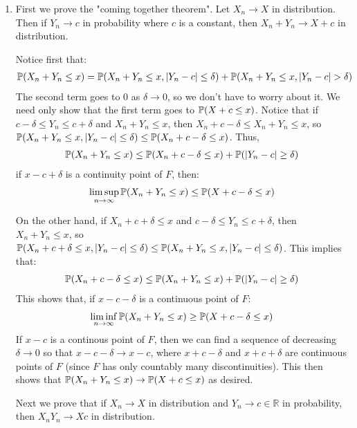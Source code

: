 \documentclass[12pt]{article}
\theoremstyle{definitionstyle}
\def\mbb#1{\mathbb{#1}}
\def\R{\mbb{R}}
\newcommand{\1}{\mathds 1}
\renewcommand{\P}{\mathbb P \qty}
\begin{document}
\begin{enumerate}
        \item 
        First we prove the "coming together theorem". Let $X_n \to X$ in distribution. Then if $Y_n \to c$ in probability where $c$ is a constant, then $X_n + Y_n \to X + c$ in distribution. 

        Notice first that:
        \begin{align*}
            \P(X_n+Y_n \leq x) = \P(X_n + Y_n \leq x, |Y_n-c| \leq \delta) + \P(X_n+Y_n \leq x, |Y_n-c|>\delta)
        \end{align*}
        The second term goes to 0 as $\delta \to 0$, so we don't have to worry about it. We need only show that the first term goes to $\P(X+c \leq x)$. Notice that if $c - \delta \leq Y_n \leq c + \delta$ and $X_n + Y_n \leq x$, then $X_n + c - \delta \leq X_n + Y_n \leq x$, so $\P(X_n + Y_n \leq x, |Y_n-c| \leq \delta) \leq \P(X_n+c-\delta \leq x)$. Thus, 
        \begin{align*}
            \P(X_n+Y_n \leq x) \leq \P(X_n+c-\delta \leq x) + \P(|Y_n-c| \geq \delta)
        \end{align*}
        if $x-c+\delta$ is a continuity point of $F$, then:
        \begin{align*}
            \limsup_{n \to \infty} \P(X_n+Y_n \leq x) \leq \P(X+c-\delta \leq x)
        \end{align*}
        
        On the other hand, if $X_n+c+\delta \leq x$ and $c - \delta \leq Y_n \leq c + \delta$, then $X_n+Y_n \leq x$, so $\P(X_n+c+\delta \leq x, |Y_n-c| \leq \delta) \leq \P(X_n+Y_n \leq x, |Y_n-c| \leq \delta)$. This implies that:
        \begin{align*}
            \P(X_n+c-\delta \leq x) \leq \P(X_n+Y_n \leq x) + \P(|Y_n-c| \geq \delta)
        \end{align*}
        This shows that, if $x-c-\delta$ is a continuous point of $F$:
        \begin{align*}
            \liminf_{n \to \infty} \P(X_n+Y_n \leq x) \geq \P(X+c-\delta \leq x)
        \end{align*}
        If $x-c$ is a continous point of $F$, then we can find a sequence of decreasing $\delta \to 0$ so that $x-c-\delta \to x-c$, where $x+c-\delta$ and $x+c+\delta$ are continuous points of $F$ (since $F$ has only countably many discontinuities). This then shows that $\P(X_n+Y_n \leq x) \to \P(X+c \leq x)$ as desired.

        Next we prove that if $X_n \to X$ in distribution and $Y_n \to c \in \R$ in probability, then $X_nY_n \to Xc$ in distribution.


\end{enumerate}
\end{document}
